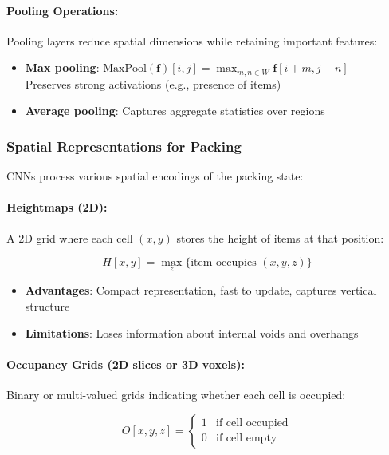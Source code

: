 \paragraph{Pooling Operations:}

Pooling layers reduce spatial dimensions while retaining important features:

\begin{itemize}
\item \textbf{Max pooling}: $\text{MaxPool}(\mathbf{f})[i, j] = \max_{m,n \in W} \mathbf{f}[i+m, j+n]$
  \\ Preserves strong activations (e.g., presence of items)
\item \textbf{Average pooling}: Captures aggregate statistics over regions
\end{itemize}

\subsubsection{Spatial Representations for Packing}

CNNs process various spatial encodings of the packing state:

\paragraph{Heightmaps (2D):}

A 2D grid where each cell $(x, y)$ stores the height of items at that position:

\begin{equation}
H[x, y] = \max_{z} \{\text{item occupies }(x, y, z)\}
\end{equation}

\begin{itemize}
\item \textbf{Advantages}: Compact representation, fast to update, captures vertical structure
\item \textbf{Limitations}: Loses information about internal voids and overhangs
\end{itemize}

\paragraph{Occupancy Grids (2D slices or 3D voxels):}

Binary or multi-valued grids indicating whether each cell is occupied:

\begin{equation}
O[x, y, z] = \begin{cases}
1 & \text{if cell occupied} \\
0 & \text{if cell empty}
\end{cases}
\end{equation}

